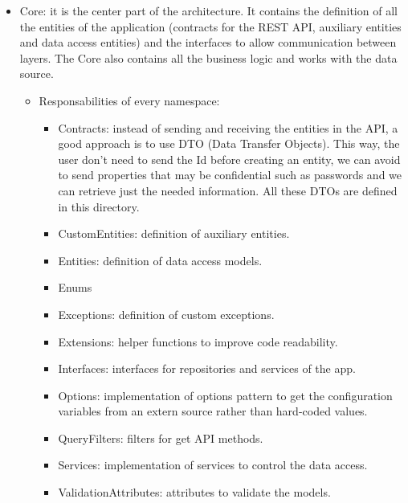 \begin{itemize}[noitemsep]
\begin{itemize}[noitemsep]
                    \end{itemize}
                \item Core: it is the center part of the architecture. 
                It contains the definition of all the entities of the application (contracts for the REST API, auxiliary entities and data access entities) and the 
                interfaces to allow communication between layers. 
                The Core also contains all the business logic and works with the data source.
                    \begin{itemize}[noitemsep] 
                        \item Responsabilities of every namespace:
                            \begin{itemize}[noitemsep]
                                \item Contracts: instead of sending and receiving the entities in the API, a good approach is to use DTO (Data Transfer Objects). This way, the user don't need to send the Id before creating an entity, we can avoid to send properties that may be confidential such as passwords and we can retrieve just the needed information. All these DTOs are defined in this directory.
                                \item CustomEntities: definition of auxiliary entities.
                                \item Entities: definition of data access models.
                                \item Enums
                                \item Exceptions: definition of custom exceptions.
                                \item Extensions: helper functions to improve code readability.
                                \item Interfaces: interfaces for repositories and services of the app.
                                \item Options: implementation of options pattern to get the configuration variables from an extern source rather than hard-coded values.
                                \item QueryFilters: filters for get API methods.
                                \item Services: implementation of services to control the data access.
                                \item ValidationAttributes: attributes to validate the models.
                            \end{itemize}

\end{itemize}
\end{itemize}
